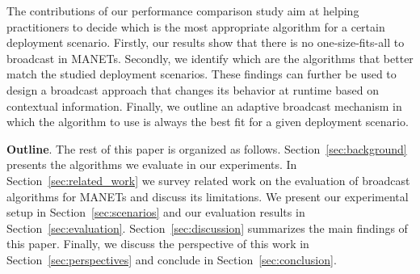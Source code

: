 The contributions of our performance comparison study aim at helping practitioners to decide which is the most appropriate algorithm for a certain deployment scenario. Firstly,
our results show that there is no one-size-fits-all to broadcast in MANETs.
%
Secondly, we identify which are the algorithms that better match the studied deployment scenarios.
%
These findings can further be used to design a broadcast approach that changes its behavior at runtime based on contextual information.
%
Finally, we outline an adaptive broadcast mechanism in which the algorithm to use is always the best fit for a given deployment scenario.

\noindent
\textbf{Outline}.
%
The rest of this paper is organized as follows.
%
Section~\ref{sec:background} presents the algorithms we evaluate in our experiments.
%
In Section~\ref{sec:related_work} we survey related work on the evaluation of broadcast algorithms for MANETs and discuss its limitations.
%
We present our experimental setup in Section~\ref{sec:scenarios} and our evaluation results in Section~\ref{sec:evaluation}.
Section~\ref{sec:discussion} summarizes the main findings of this paper.
%
Finally, we discuss the perspective of this work in Section~\ref{sec:perspectives} and conclude in Section~\ref{sec:conclusion}.


